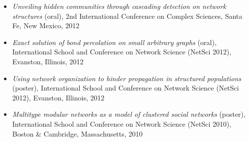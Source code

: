 \documentclass[11pt]{article}
\begin{document}
\begin{itemize}
%
  \item \textit{Unveiling hidden communities through cascading detection on network structures} (oral), 2nd International Conference on Complex Sciences, Santa Fe, New Mexico, 2012
%
  \item \textit{Exact solution of bond percolation on small arbitrary graphs} (oral), International School and Conference on Network Science (NetSci 2012), Evanston, Illinois, 2012
%
  \item \textit{Using network organization to hinder propagation in structured populations} (poster), International School and Conference on Network Science (NetSci 2012), Evanston, Illinois, 2012
%
%
  \item \textit{Multitype modular networks as a model of clustered social networks} (poster), International School and Conference on Network Science (NetSci 2010), Boston \& Cambridge, Massachusetts, 2010
%
%
%
%

\end{itemize}
\end{document}
